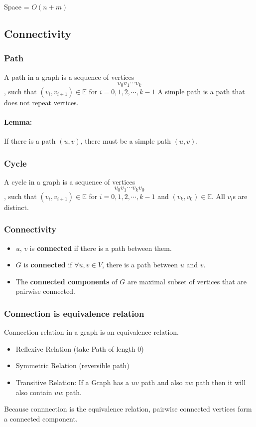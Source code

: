 \documentclass[en,hazy,blue,screen,14pt]{elegantnote}
\begin{document}
Space = $O(n + m)$
\subsection{Connectivity}
\subsubsection{Path}
A path in a graph is a sequence of vertices
\[v_0 v_1 \cdots v_k\]
, such that $(v_i, v_{i+1}) \in \mathbb{E}$ for $i = 0, 1, 2, \cdots, k-1$
A simple path is a path that does not repeat vertices.
\paragraph{Lemma:}
If there is a path $(u, v)$, there must be a simple path $(u, v)$.
\subsubsection{Cycle}
A cycle in a graph is a sequence of vertices
\[v_0 v_1 \cdots v_kv_0\]
, such that $(v_i, v_{i+1}) \in \mathbb{E}$ for $i = 0, 1, 2, \cdots, k-1$ and 
$(v_k, v_{0}) \in \mathbb{E}$. All $v_i$s are distinct.

\subsubsection{Connectivity}
\begin{itemize}
 \item $u$, $v$ is \textbf{connected} if there is a path between them.
 \item $G$ is \textbf{connected} if $\forall u, v \in V$, there is a path 
between $u$ and $v$.
\item The \textbf{connected components} of $G$ are maximal subset of vertices 
that are pairwise connected.
\end{itemize}

\subsubsection{Connection is equivalence relation}
Connection relation in a graph is an equivalence relation.
\begin{itemize}
 \item Reflexive Relation (take Path of length 0)
 \item Symmetric Relation (reversible path)
 \item Transitive Relation: If a Graph has a $uv$ path and also $vw$ path then 
it will also contain $uw$ path.
\end{itemize}
Because connnection is the equivalence relation, pairwise connected vertices 
form a connected component.
\end{document}
